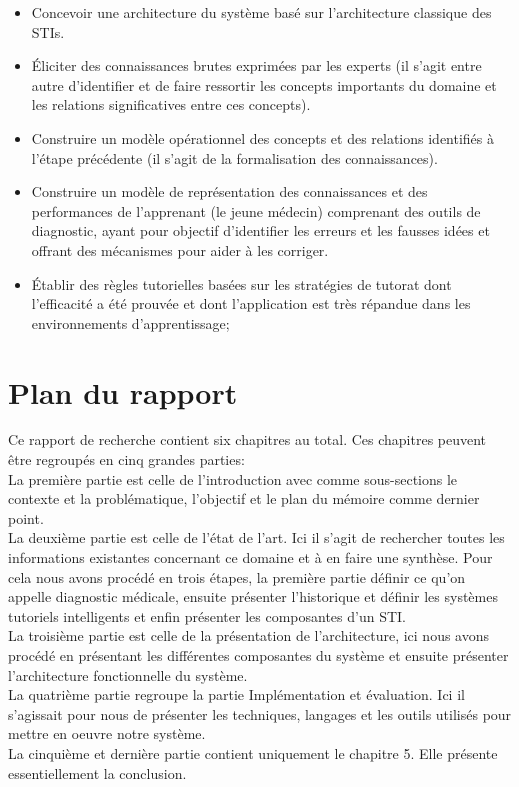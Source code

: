 \begin{itemize}
    \item Concevoir une architecture du système basé sur l'architecture classique des STIs.
    \item Éliciter des connaissances brutes exprimées par les experts (il s'agit entre autre d'identifier et de faire ressortir les concepts importants du domaine et les relations significatives entre ces concepts).
    \item Construire un modèle opérationnel des concepts et des relations identifiés à
l'étape précédente (il s'agit de la formalisation des connaissances).
    \item Construire un modèle de représentation des connaissances et des performances de l'apprenant (le jeune médecin) comprenant des outils de diagnostic, ayant pour objectif d'identifier les erreurs et les fausses idées et offrant des mécanismes pour aider à les corriger.
    \item Établir des règles tutorielles basées sur les stratégies de tutorat dont l'efficacité a été prouvée et dont l'application est très répandue dans les environnements d'apprentissage;
\end{itemize}


\newpage

\section{Plan du rapport}
Ce rapport de recherche contient six chapitres au total. Ces chapitres peuvent être regroupés en cinq grandes parties:\\
La première partie est celle de l'introduction avec comme sous-sections le contexte et la problématique, l'objectif et le plan du mémoire comme dernier point.\\
La deuxième partie est celle de l'état de l'art. Ici il s'agit de rechercher toutes les informations existantes concernant ce domaine et à en faire une synthèse. Pour cela nous avons procédé en trois étapes, la première partie définir ce qu'on appelle diagnostic médicale, ensuite présenter l'historique et définir les systèmes tutoriels intelligents et enfin présenter les composantes d'un STI.  \\
La troisième partie est celle de la présentation de l'architecture, ici nous avons procédé en présentant les différentes composantes du système et ensuite présenter l'architecture fonctionnelle du système.\\
La quatrième partie regroupe la partie Implémentation et évaluation. Ici il s'agissait pour nous de présenter les techniques, langages et les outils utilisés pour mettre en oeuvre notre système. \\
La cinquième et dernière partie contient uniquement le chapitre 5. Elle présente essentiellement la conclusion.\\
